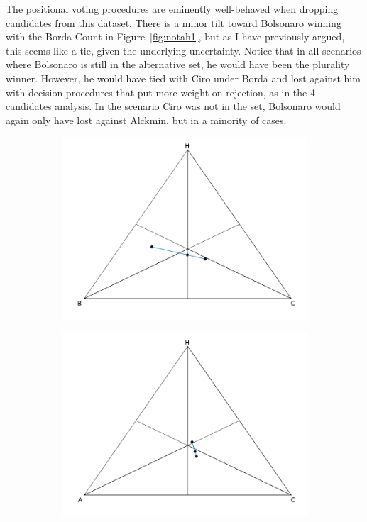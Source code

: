 \documentclass[hidelinks,11pt]{article} \usepackage[utf8]{inputenc}
\begin{document}
The positional voting procedures are eminently well-behaved when dropping
candidates from this dataset. There is a minor tilt toward Bolsonaro winning
with the Borda Count in Figure~\ref{fig:notah1}, but as I have previously
argued, this seems like a tie, given the underlying uncertainty. Notice that in
all scenarios where Bolsonaro is still in the alternative set, he would have
been the plurality winner. However, he would have tied with Ciro under Borda and
lost against him with decision procedures that put more weight on rejection, as
in the 4 candidates analysis. In the scenario Ciro was not in the set, Bolsonaro
would again only have lost against Alckmin, but in a minority of cases.


\begin{figure}[!h] \centering
        \begin{subfigure}[b]{0.475\textwidth} \centering
\includegraphics[width=\textwidth]{./images/cw1_nota.png}
             \caption{}%
            \label{fig:notac1}
        \end{subfigure} \hfill
        \begin{subfigure}[b]{0.475\textwidth} \centering
\includegraphics[width=\textwidth]{./images/cw1_notb.png}

\end{subfigure}
\end{figure}
\end{document}
